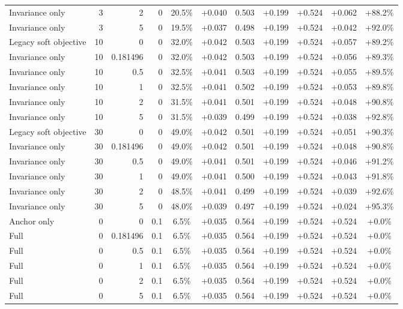 \begin{table}[htbp]
\begin{tabular}{lrrrccccccc}
Invariance only & 3 & 2 & 0 & 20.5\% & +0.040 & 0.503 & +0.199 & +0.524 & +0.062 & +88.2\% \\
Invariance only & 3 & 5 & 0 & 19.5\% & +0.037 & 0.498 & +0.199 & +0.524 & +0.042 & +92.0\% \\
Legacy soft objective & 10 & 0 & 0 & 32.0\% & +0.042 & 0.503 & +0.199 & +0.524 & +0.057 & +89.2\% \\
Invariance only & 10 & 0.181496 & 0 & 32.0\% & +0.042 & 0.503 & +0.199 & +0.524 & +0.056 & +89.3\% \\
Invariance only & 10 & 0.5 & 0 & 32.5\% & +0.041 & 0.503 & +0.199 & +0.524 & +0.055 & +89.5\% \\
Invariance only & 10 & 1 & 0 & 32.5\% & +0.041 & 0.502 & +0.199 & +0.524 & +0.053 & +89.8\% \\
Invariance only & 10 & 2 & 0 & 31.5\% & +0.041 & 0.501 & +0.199 & +0.524 & +0.048 & +90.8\% \\
Invariance only & 10 & 5 & 0 & 31.5\% & +0.039 & 0.499 & +0.199 & +0.524 & +0.038 & +92.8\% \\
Legacy soft objective & 30 & 0 & 0 & 49.0\% & +0.042 & 0.501 & +0.199 & +0.524 & +0.051 & +90.3\% \\
Invariance only & 30 & 0.181496 & 0 & 49.0\% & +0.042 & 0.501 & +0.199 & +0.524 & +0.048 & +90.8\% \\
Invariance only & 30 & 0.5 & 0 & 49.0\% & +0.041 & 0.501 & +0.199 & +0.524 & +0.046 & +91.2\% \\
Invariance only & 30 & 1 & 0 & 49.0\% & +0.041 & 0.500 & +0.199 & +0.524 & +0.043 & +91.8\% \\
Invariance only & 30 & 2 & 0 & 48.5\% & +0.041 & 0.499 & +0.199 & +0.524 & +0.039 & +92.6\% \\
Invariance only & 30 & 5 & 0 & 48.0\% & +0.039 & 0.497 & +0.199 & +0.524 & +0.024 & +95.3\% \\
Anchor only & 0 & 0 & 0.1 & 6.5\% & +0.035 & 0.564 & +0.199 & +0.524 & +0.524 & +0.0\% \\
Full & 0 & 0.181496 & 0.1 & 6.5\% & +0.035 & 0.564 & +0.199 & +0.524 & +0.524 & +0.0\% \\
Full & 0 & 0.5 & 0.1 & 6.5\% & +0.035 & 0.564 & +0.199 & +0.524 & +0.524 & +0.0\% \\
Full & 0 & 1 & 0.1 & 6.5\% & +0.035 & 0.564 & +0.199 & +0.524 & +0.524 & +0.0\% \\
Full & 0 & 2 & 0.1 & 6.5\% & +0.035 & 0.564 & +0.199 & +0.524 & +0.524 & +0.0\% \\
Full & 0 & 5 & 0.1 & 6.5\% & +0.035 & 0.564 & +0.199 & +0.524 & +0.524 & +0.0\% \\

\end{tabular}
\end{table}
